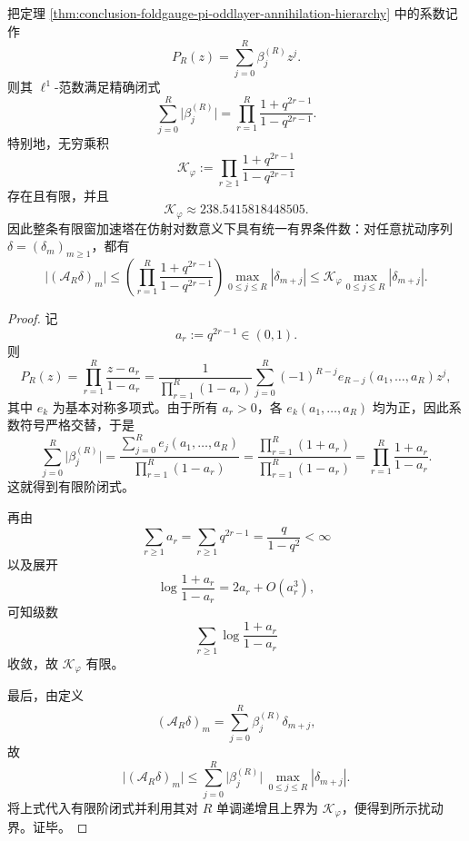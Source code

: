 \begin{theorem}[加速层级的统一有界条件数]\label{thm:conclusion-foldgauge-pi-accelerator-uniform-conditioning}
把定理 \ref{thm:conclusion-foldgauge-pi-oddlayer-annihilation-hierarchy} 中的系数记作
\[
P_R(z)=\sum_{j=0}^{R}\beta_j^{(R)}z^j.
\]
则其 \(\ell^1\)-范数满足精确闭式
\[
\sum_{j=0}^{R}\bigl|\beta_j^{(R)}\bigr|
=
\prod_{r=1}^{R}\frac{1+q^{2r-1}}{1-q^{2r-1}}.
\]
特别地，无穷乘积
\[
\mathcal K_\varphi
:=
\prod_{r\ge 1}\frac{1+q^{2r-1}}{1-q^{2r-1}}
\]
存在且有限，并且
\[
\mathcal K_\varphi\approx 238.5415818448505.
\]
因此整条有限窗加速塔在仿射对数意义下具有统一有界条件数：对任意扰动序列 \(\delta=(\delta_m)_{m\ge 1}\)，都有
\[
\bigl|(\mathcal A_R\delta)_m\bigr|
\le
\left(\prod_{r=1}^{R}\frac{1+q^{2r-1}}{1-q^{2r-1}}\right)
\max_{0\le j\le R}|\delta_{m+j}|
\le
\mathcal K_\varphi \max_{0\le j\le R}|\delta_{m+j}|.
\]
\end{theorem}
\begin{proof}
记
\[
a_r:=q^{2r-1}\in(0,1).
\]
则
\[
P_R(z)
=
\prod_{r=1}^{R}\frac{z-a_r}{1-a_r}
=
\frac{1}{\prod_{r=1}^{R}(1-a_r)}
\sum_{j=0}^{R}(-1)^{R-j}e_{R-j}(a_1,\dots,a_R)z^j,
\]
其中 \(e_k\) 为基本对称多项式。由于所有 \(a_r>0\)，各 \(e_k(a_1,\dots,a_R)\) 均为正，因此系数符号严格交替，于是
\[
\sum_{j=0}^{R}\bigl|\beta_j^{(R)}\bigr|
=
\frac{\sum_{j=0}^{R}e_j(a_1,\dots,a_R)}{\prod_{r=1}^{R}(1-a_r)}
=
\frac{\prod_{r=1}^{R}(1+a_r)}{\prod_{r=1}^{R}(1-a_r)}
=
\prod_{r=1}^{R}\frac{1+a_r}{1-a_r}.
\]
这就得到有限阶闭式。

再由
\[
\sum_{r\ge 1}a_r=\sum_{r\ge 1}q^{2r-1}=\frac{q}{1-q^2}<\infty
\]
以及展开
\[
\log\frac{1+a_r}{1-a_r}=2a_r+O(a_r^3),
\]
可知级数
\[
\sum_{r\ge 1}\log\frac{1+a_r}{1-a_r}
\]
收敛，故 \(\mathcal K_\varphi\) 有限。

最后，由定义
\[
(\mathcal A_R\delta)_m=\sum_{j=0}^{R}\beta_j^{(R)}\delta_{m+j},
\]
故
\[
\bigl|(\mathcal A_R\delta)_m\bigr|
\le
\sum_{j=0}^{R}\bigl|\beta_j^{(R)}\bigr|\,\max_{0\le j\le R}|\delta_{m+j}|.
\]
将上式代入有限阶闭式并利用其对 \(R\) 单调递增且上界为 \(\mathcal K_\varphi\)，便得到所示扰动界。证毕。
\end{proof}

